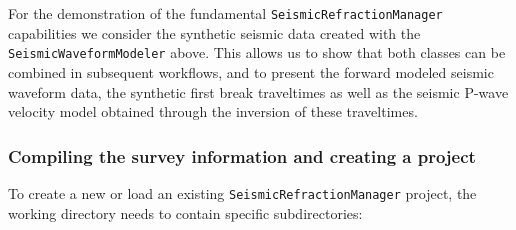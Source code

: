 \documentclass[a4paper,fleqn]{cas-sc}
\begin{document}
For the demonstration of the fundamental \texttt{SeismicRefractionManager} capabilities we consider the synthetic seismic data created with the \texttt{SeismicWaveformModeler} above. This allows us to show that both classes can be combined in subsequent workflows, and to present the forward modeled seismic waveform data, the synthetic first break traveltimes as well as the seismic P-wave velocity model obtained through the inversion of these traveltimes. 

\subsubsection{Compiling the survey information and creating a project}

To create a new or load an existing \texttt{SeismicRefractionManager} project, the working directory needs to contain specific subdirectories:
\end{document}

